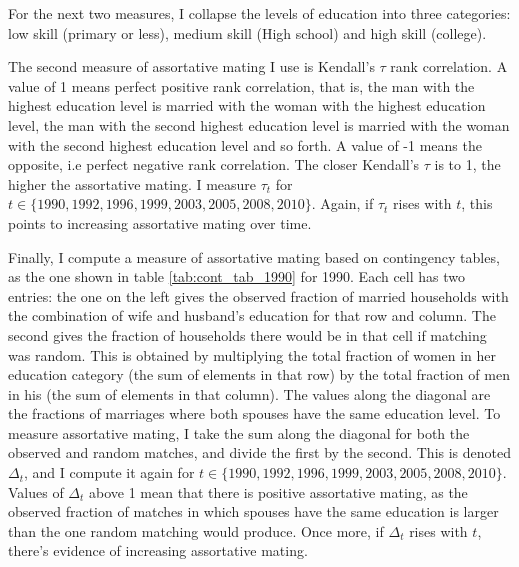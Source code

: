 \documentclass[12pt]{article}
\begin{document}
For the next two measures, I collapse the levels of education into three categories: low skill (primary or less), medium skill (High school) and high skill (college).

The second measure of assortative mating I use is Kendall's $\tau$ rank correlation. A value of 1 means perfect positive rank correlation, that is, the man with the highest education level is married with the woman with the highest education level, the man with the second highest education level is married with the woman with the second highest education level and so forth. A value of -1 means the opposite, i.e perfect negative rank correlation. The closer Kendall's $\tau$ is to 1, the higher the assortative mating. I measure $\tau_t$ for $t\in \{1990,1992,1996,1999,2003,2005,2008,2010\}$. Again, if $\tau_t$ rises with $t$, this points to increasing assortative mating over time.

Finally, I compute a measure of assortative mating based on contingency tables, as the one shown in table \ref{tab:cont_tab_1990} for 1990. Each cell has two entries: the one on the left gives the observed fraction of married households with the combination of wife and husband's education for that row and column. The second gives the fraction of households there would be in that cell if matching was random. This is obtained by multiplying the total fraction of women in her education category (the sum of elements in that row) by the total fraction of men in his (the sum of elements in that column). The values along the diagonal are the fractions of marriages where both spouses have the same education level. To measure assortative mating, I take the sum along the diagonal for both the observed and random matches, and divide the first by the second. This is denoted $\Delta_t$, and I compute it again for $t\in \{1990,1992,1996,1999,2003,2005,2008,2010\}$. Values of $\Delta_t$ above 1 mean that there is positive assortative mating, as the observed fraction of matches in which spouses have the same education is larger than the one random matching would produce. Once more, if $\Delta_t$ rises with $t$, there's evidence of increasing assortative mating.
\end{document}

